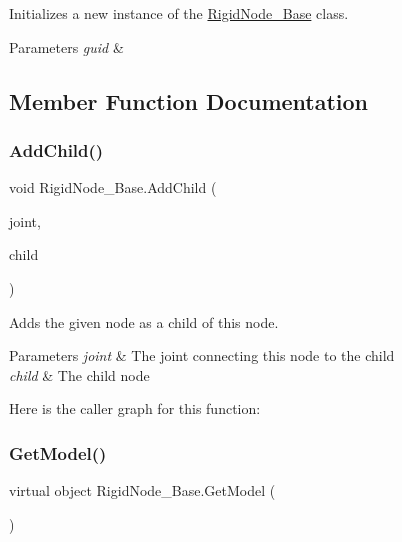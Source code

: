 Initializes a new instance of the \hyperlink{class_rigid_node___base}{Rigid\+Node\+\_\+\+Base} class. 


\begin{DoxyParams}{Parameters}
{\em guid} & \\
\hline
\end{DoxyParams}


\subsection{Member Function Documentation}
\mbox{\label{class_rigid_node___base_a287e7e27c6fc9d2b104e6f2578e96af8}} 
\subsubsection{\texorpdfstring{Add\+Child()}{AddChild()}}
{\footnotesize\ttfamily void Rigid\+Node\+\_\+\+Base.\+Add\+Child (\begin{DoxyParamCaption}\item[{\hyperlink{class_skeletal_joint___base}{Skeletal\+Joint\+\_\+\+Base}}]{joint,  }\item[{\hyperlink{class_rigid_node___base}{Rigid\+Node\+\_\+\+Base}}]{child }\end{DoxyParamCaption})}



Adds the given node as a child of this node. 


\begin{DoxyParams}{Parameters}
{\em joint} & The joint connecting this node to the child\\
\hline
{\em child} & The child node\\
\hline
\end{DoxyParams}
Here is the caller graph for this function\+:
\mbox{\label{class_rigid_node___base_a68abee405ea4eb8185ec902791e085eb}} 
\subsubsection{\texorpdfstring{Get\+Model()}{GetModel()}}
{\footnotesize\ttfamily virtual object Rigid\+Node\+\_\+\+Base.\+Get\+Model (\begin{DoxyParamCaption}{ }\end{DoxyParamCaption})\hspace{0.3cm}{\ttfamily [virtual]}}



